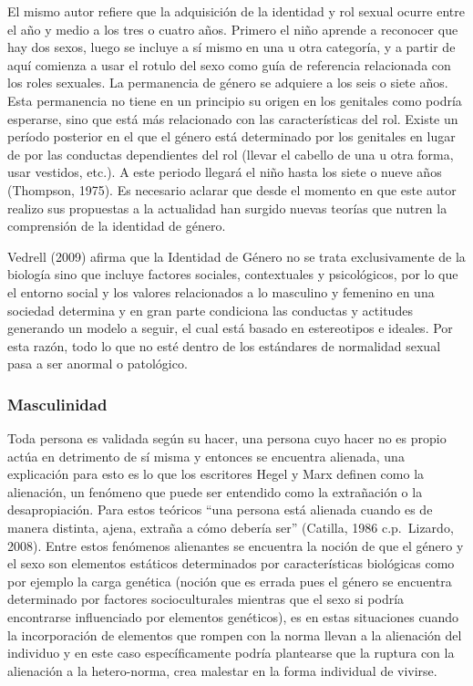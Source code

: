 El mismo autor refiere que la adquisición de la identidad y rol sexual ocurre
entre el año y medio a los tres o cuatro años.
Primero el niño aprende a reconocer que hay dos sexos, luego se incluye a sí
mismo en una u otra categoría, y a partir de aquí comienza a usar el rotulo del
sexo como guía de referencia relacionada con los roles sexuales.
La permanencia de género se adquiere a los seis o siete años.
Esta permanencia no tiene en un principio su origen en los genitales como podría
esperarse, sino que está más relacionado con las características del rol.
Existe un período posterior en el que el género está determinado por los
genitales en lugar de por las conductas dependientes del rol (llevar el cabello
de una u otra forma, usar vestidos, etc.).
A este periodo llegará el niño hasta los siete o nueve años (Thompson, 1975).
Es necesario aclarar que desde el momento en que este autor realizo sus
propuestas a la actualidad han surgido nuevas teorías que nutren la comprensión
de la identidad de género.

Vedrell (2009) afirma que la Identidad de Género no se trata exclusivamente de
la biología sino que incluye factores sociales, contextuales y psicológicos, por
lo que el entorno social y los valores relacionados a lo masculino y femenino en
una sociedad determina y en gran parte condiciona las conductas y actitudes
generando un modelo a seguir, el cual está basado en estereotipos e ideales.
Por esta razón, todo lo que no esté dentro de los estándares de normalidad
sexual pasa a ser anormal o patológico.

\subsubsection{Masculinidad}
Toda persona es validada según su hacer, una persona cuyo hacer no es propio
actúa en detrimento de sí misma y entonces se encuentra alienada, una
explicación para esto es lo que los escritores Hegel y Marx definen como la
alienación, un fenómeno que puede ser entendido como la extrañación o la
desapropiación.
Para estos teóricos “una persona está alienada cuando es de manera distinta,
ajena, extraña a cómo debería ser” (Catilla, 1986 c.p.~Lizardo, 2008).
Entre estos fenómenos alienantes se encuentra la noción de que el género y el
sexo son elementos estáticos determinados por características biológicas como
por ejemplo la carga genética (noción que es errada pues el género se encuentra
determinado por factores socioculturales mientras que el sexo si podría
encontrarse influenciado por elementos genéticos), es en estas situaciones
cuando la incorporación de elementos que rompen con la norma llevan a la
alienación del individuo y en este caso específicamente podría plantearse que la
ruptura con la alienación a la hetero-norma, crea malestar en la forma
individual de vivirse.

